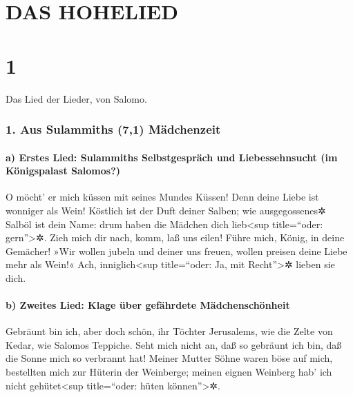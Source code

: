 \hypertarget{das-hohelied}{%
\section{DAS HOHELIED}\label{das-hohelied}}

\hypertarget{section}{%
\section{1}\label{section}}

Das Lied der Lieder, von Salomo.

\hypertarget{aus-sulammiths-71-muxe4dchenzeit}{%
\subsubsection{1. Aus Sulammiths (7,1)
Mädchenzeit}\label{aus-sulammiths-71-muxe4dchenzeit}}

\hypertarget{a-erstes-lied-sulammiths-selbstgespruxe4ch-und-liebessehnsucht-im-kuxf6nigspalast-salomos}{%
\paragraph{a) Erstes Lied: Sulammiths Selbstgespräch und Liebessehnsucht
(im Königspalast
Salomos?)}\label{a-erstes-lied-sulammiths-selbstgespruxe4ch-und-liebessehnsucht-im-kuxf6nigspalast-salomos}}

O möcht' er mich küssen mit seines Mundes Küssen! Denn
deine Liebe ist wonniger als Wein! Köstlich ist der Duft
deiner Salben; wie ausgegossenes✲ Salböl ist dein Name: drum haben die
Mädchen dich lieb\textless sup title=``oder: gern''\textgreater✲.
Zieh mich dir nach, komm, laß uns eilen! Führe mich,
König, in deine Gemächer! »Wir wollen jubeln und deiner uns freuen,
wollen preisen deine Liebe mehr als Wein!« Ach, inniglich\textless sup
title=``oder: Ja, mit Recht''\textgreater✲ lieben sie dich.

\hypertarget{b-zweites-lied-klage-uxfcber-gefuxe4hrdete-muxe4dchenschuxf6nheit}{%
\paragraph{b) Zweites Lied: Klage über gefährdete
Mädchenschönheit}\label{b-zweites-lied-klage-uxfcber-gefuxe4hrdete-muxe4dchenschuxf6nheit}}

Gebräunt bin ich, aber doch schön, ihr Töchter Jerusalems,
wie die Zelte von Kedar, wie Salomos Teppiche. Seht mich
nicht an, daß so gebräunt ich bin, daß die Sonne mich so verbrannt hat!
Meiner Mutter Söhne waren böse auf mich, bestellten mich zur Hüterin der
Weinberge; meinen eignen Weinberg hab' ich nicht gehütet\textless sup
title=``oder: hüten können''\textgreater✲.

